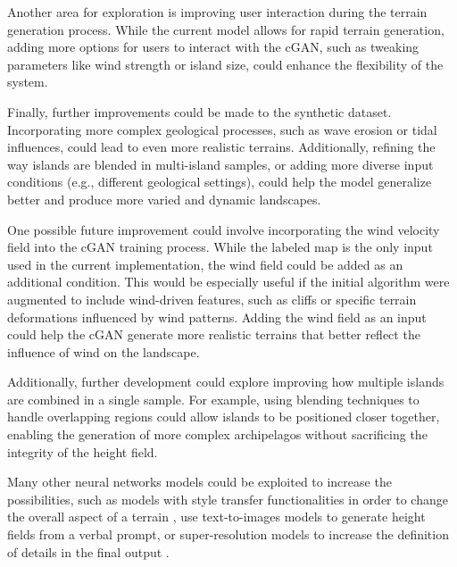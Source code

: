 Another area for exploration is improving user interaction during the terrain generation process. While the current model allows for rapid terrain generation, adding more options for users to interact with the cGAN, such as tweaking parameters like wind strength or island size, could enhance the flexibility of the system.

Finally, further improvements could be made to the synthetic dataset. Incorporating more complex geological processes, such as wave erosion or tidal influences, could lead to even more realistic terrains. Additionally, refining the way islands are blended in multi-island samples, or adding more diverse input conditions (e.g., different geological settings), could help the model generalize better and produce more varied and dynamic landscapes.


One possible future improvement could involve incorporating the wind velocity field into the cGAN training process. While the labeled map is the only input used in the current implementation, the wind field could be added as an additional condition. This would be especially useful if the initial algorithm were augmented to include wind-driven features, such as cliffs or specific terrain deformations influenced by wind patterns. Adding the wind field as an input could help the cGAN generate more realistic terrains that better reflect the influence of wind on the landscape.

Additionally, further development could explore improving how multiple islands are combined in a single sample. For example, using blending techniques to handle overlapping regions could allow islands to be positioned closer together, enabling the generation of more complex archipelagos without sacrificing the integrity of the height field.

Many other neural networks models could be exploited to increase the possibilities, such as models with style transfer functionalities \cite{Gatys2015,Zhu2020} in order to change the overall aspect of a terrain \cite{Perche2023a,Perche2023b}, use text-to-images models \cite{Rombach2021,Radford2021} to generate height fields from a verbal prompt, or super-resolution models \cite{Dong2014} to increase the definition of details in the final output \cite{Guerin2016a}.
